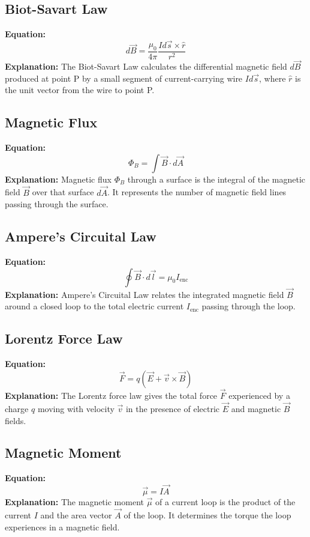 \documentclass{article}
\begin{document}
\subsection*{Biot-Savart Law}
\textbf{Equation:} 
\[ d\vec{B} = \frac{\mu_0}{4\pi} \frac{Id\vec{s} \times \hat{r}}{r^2} \]
\textbf{Explanation:} 
The Biot-Savart Law calculates the differential magnetic field \( d\vec{B} \) produced at point P by a small segment of current-carrying wire \( Id\vec{s} \), where \( \hat{r} \) is the unit vector from the wire to point P.

\subsection*{Magnetic Flux}
\textbf{Equation:} 
\[ \Phi_B = \int \vec{B} \cdot d\vec{A} \]
\textbf{Explanation:} 
Magnetic flux \( \Phi_B \) through a surface is the integral of the magnetic field \( \vec{B} \) over that surface \( d\vec{A} \). It represents the number of magnetic field lines passing through the surface.

\subsection*{Ampere's Circuital Law}
\textbf{Equation:} 
\[ \oint \vec{B} \cdot d\vec{l} = \mu_0 I_{\text{enc}} \]
\textbf{Explanation:} 
Ampere's Circuital Law relates the integrated magnetic field \( \vec{B} \) around a closed loop to the total electric current \( I_{\text{enc}} \) passing through the loop.

\subsection*{Lorentz Force Law}
\textbf{Equation:} 
\[ \vec{F} = q(\vec{E} + \vec{v} \times \vec{B}) \]
\textbf{Explanation:} 
The Lorentz force law gives the total force \( \vec{F} \) experienced by a charge \( q \) moving with velocity \( \vec{v} \) in the presence of electric \( \vec{E} \) and magnetic \( \vec{B} \) fields.

\subsection*{Magnetic Moment}
\textbf{Equation:} 
\[ \vec{\mu} = I\vec{A} \]
\textbf{Explanation:} 
The magnetic moment \( \vec{\mu} \) of a current loop is the product of the current \( I \) and the area vector \( \vec{A} \) of the loop. It determines the torque the loop experiences in a magnetic field.
\end{document}
